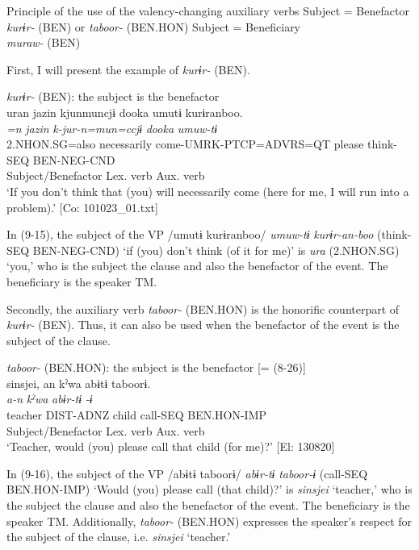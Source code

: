 \ea   Principle of the use of the valency-changing auxiliary verbs \label{ex:9.14}
  \ea Subject = Benefactor\\
    \textit{kurɨr-} (BEN) or \textit{taboor-} (BEN.HON)
  \ex Subject = Beneficiary\\
    \textit{muraw-} (BEN)
    \z
\z

    
  First, I will present the example of \textit{kurɨr-} (BEN).

\ea   \textit{kurɨr-} (BEN): the subject is the benefactor\label{ex:9.15}\\
 \gllll  uran  jazin  kjunmuncjɨ  dooka  umutɨ  kurɨranboo.\\
    \textit{=n}  \textit{jazin}  \textit{k-jur-n=mun=ccjɨ}  \textit{dooka}  \textit{umuw-tɨ}  \textit{}\\
    2.NHON.SG=also  necessarily  come-UMRK-PTCP=ADVRS=QT  please  think-SEQ  BEN-NEG-CND\\
    Subject/Benefactor                                             Lex. verb  Aux. verb\\
    \glt     ‘If you don’t think that (you) will necessarily come (here for me, I will run into a problem).’ [Co: 101023\_01.txt]
\z

In (9-15), the subject of the VP /umutɨ kurɨranboo/ \textit{umuw-tɨ} \textit{kurɨr-an-boo} (think-SEQ BEN-NEG-CND) ‘if (you) don’t think (of it for me)’ is \textit{ura} (2.NHON.SG) ‘you,’ who is the subject the clause and also the benefactor of the event. The beneficiary is the speaker TM.

  Secondly, the auxiliary verb \textit{taboor-} (BEN.HON) is the honorific counterpart of \textit{kurɨr-} (BEN). Thus, it can also be used when the benefactor of the event is the subject of the clause.

\ea   \textit{taboor-} (BEN.HON): the subject is the benefactor [= (8-26)]\label{ex:9.16}\\
 \gllll  {\textbar}sinsjei{\textbar},  an  kˀwa  abɨtɨ  taboorɨ.\\
    \textit{}  \textit{a-n}  \textit{kˀwa}  \textit{abɨr-tɨ}  \textit{-ɨ}\\
    teacher  DIST-ADNZ  child  call-SEQ  BEN.HON-IMP\\
    Subject/Benefactor      Lex. verb  Aux. verb\\
    \glt     ‘Teacher, would (you) please call that child (for me)?’ [El: 130820]
\z

In (9-16), the subject of the VP /abɨtɨ taboorɨ/ \textit{abɨr-tɨ} \textit{taboor-ɨ} (call-SEQ BEN.HON-IMP) ‘Would (you) please call (that child)?’ is \textit{sinsjei} ‘teacher,’ who is the subject the clause and also the benefactor of the event. The beneficiary is the speaker TM. Additionally, \textit{taboor-} (BEN.HON) expresses the speaker’s respect for the subject of the clause, i.e. \textit{sinsjei} ‘teacher.’

